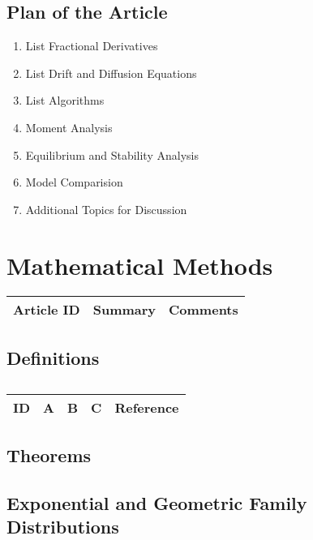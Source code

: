 \subsection{Plan of the Article}

\begin{enumerate}
\item List Fractional Derivatives
\item List Drift and Diffusion Equations
\item List Algorithms
\item Moment Analysis
\item Equilibrium and Stability Analysis
\item Model Comparision
\item Additional Topics for Discussion
\end{enumerate}

\section{Mathematical Methods}

\begin{table}[H]\centering
	\begin{tabular}{p{1cm}p{4cm}p{3cm}}
		Article ID & Summary & Comments\\
		\hline
		\hline
	\end{tabular}
\end{table}

\subsection{Definitions}

\centering
\begin{table}[H]\footnotesize
	\caption{}
	\begin{tabular}{rp{1cm}p{2cm}p{3cm}p{1cm}}
		\hline
		ID & A & B & C & Reference \\
		\hline
		\hline
	\end{tabular}
\end{table}
\raggedright

\subsection{Theorems}

\subsection{Exponential and Geometric Family Distributions}

